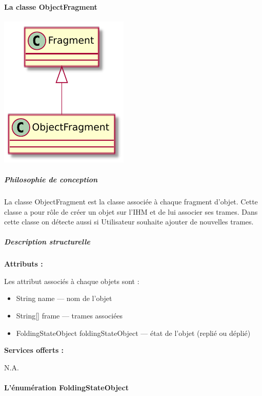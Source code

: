 \paragraph{La classe ObjectFragment}

\begin{minipage}
    {\linewidth}
    \centering
    \includegraphics[width=0.40\linewidth]{../schemas/Conception_detaillee/classe_objectFragment.pdf}
\end{minipage}

\subparagraph{Philosophie de conception \newline} 

\medspace

La classe ObjectFragment est la classe associée à chaque fragment d'objet. Cette classe a pour rôle de créer un objet sur l'IHM et de lui associer ses trames.
Dans cette classe on détecte aussi si Utilisateur souhaite ajouter de nouvelles trames. 


\subparagraph{Description structurelle \newline}

\medspace

\textbf{Attributs :}

Les attribut associés à chaque objets sont : 
\begin{itemize}
    \item String name --- nom de l'objet
    \item String[] frame --- trames associées
    \item FoldingStateObject foldingStateObject --- état de l'objet (replié ou déplié)
\end{itemize}

\textbf{Services offerts :}

N.A.

\paragraph{L'énumération FoldingStateObject}

